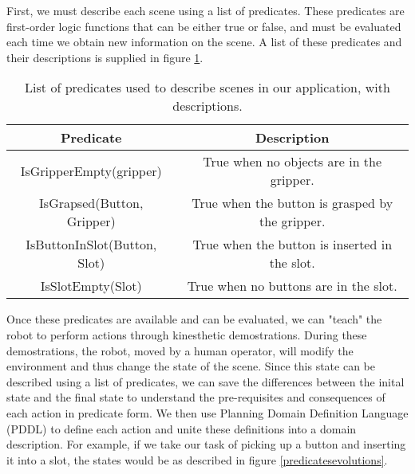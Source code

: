 First, we must describe each scene using a list of predicates. These predicates are first-order logic functions that can be either true or false, and must be evaluated each time we obtain new information on the scene. A list of these predicates and their descriptions is supplied in figure \ref{predicateslist}.

\begin{table}[ht]
    \begin{center}
        \begin{tabular}{cc}
            Predicate & Description \\
            \hline \hline
            IsGripperEmpty(gripper) & True when no objects are in the gripper. \\
            \hline
            IsGrapsed(Button, Gripper) & True when the button is grasped by the gripper. \\
            \hline
            IsButtonInSlot(Button, Slot) & True when the button is inserted in the slot. \\
            \hline
            IsSlotEmpty(Slot) & True when no buttons are in the slot.\\
        \end{tabular}
        \caption{List of predicates used to describe scenes in our application, with descriptions.}
        \label{predicateslist}
    \end{center}
\end{table}

Once these predicates are available and can be evaluated, we can "teach" the robot to perform actions through kinesthetic demostrations. During these demostrations, the robot, moved by a human operator, will modify the environment and thus change the state of the scene. Since this state can be described using a list of predicates, we can save the differences between the inital state and the final state to understand the pre-requisites and consequences of each action in predicate form. We then use Planning Domain Definition Language (PDDL) \cite{pddl} to define each action and unite these definitions into a domain description. For example, if we take our task of picking up a button and inserting it into a slot, the states would be as described in figure \ref{predicatesevolutions}.

